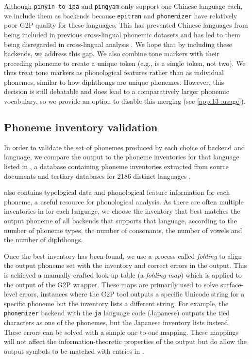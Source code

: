 Although \texttt{pinyin-to-ipa} and \texttt{pingyam} only support one Chinese language each, we include them as backends because \texttt{epitran} and \texttt{phonemizer} have relatively poor G2P quality for these languages. This has prevented Chinese languages from being included in previous cross-lingual phonemic datasets \citep{ahn-chodroff-2022-voxcommunis} and has led to them being disregarded in cross-lingual analysis \citep{pimentel2020phonotactic}. We hope that by including these backends, we address this gap. We also combine tone markers with their preceding phoneme to create a unique token (e.g.,  is a single token, not two). We thus treat tone markers as phonological features rather than as individual phonemes, similar to how diphthongs are unique phonemes. However, this decision is still debatable and does lead to a comparatively larger phonemic vocabulary, so we provide an option to disable this merging (see \cref{app:13-:usage}). %

\subsection{Phoneme inventory validation}\label{sec:13-folding}

In order to validate the set of phonemes produced by each choice of backend and language, we compare the output to the phoneme inventories for that language listed in \phoible, a database containing phoneme inventories extracted from source documents and tertiary databases for 2186 distinct languages \citep{phoible}.

\phoible also contains typological data and phonological feature information for each phoneme, a useful resource for phonological analysis. As there are often multiple inventories in \phoible for each language, we choose the inventory that best matches the output phoneme of all backends that supports that language, according to the number of phoneme types, the number of consonants, the number of vowels and the number of diphthongs.

Once the best inventory has been found, we use a process called \emph{folding} to align the output phoneme set with the inventory and correct errors in the output. This is achieved a manually-crafted look-up table (a \emph{folding map}) which is applied to the output of the G2P wrapper. These maps are primarily used to solve surface-level errors, instances where the G2P tool outputs a specific Unicode string for a specific phoneme but the inventory lists a different string. For example, the \texttt{phonemizer} backend with the \texttt{ja} language code (Japanese) outputs the tied characters  as one of the phonemes, but the Japanese inventory lists  instead. These errors can be solved with a simple one-to-one mapping. These mappings will not affect the information-theoretic properties of the output but do allow the output symbols to be matched with entries in \phoible.

